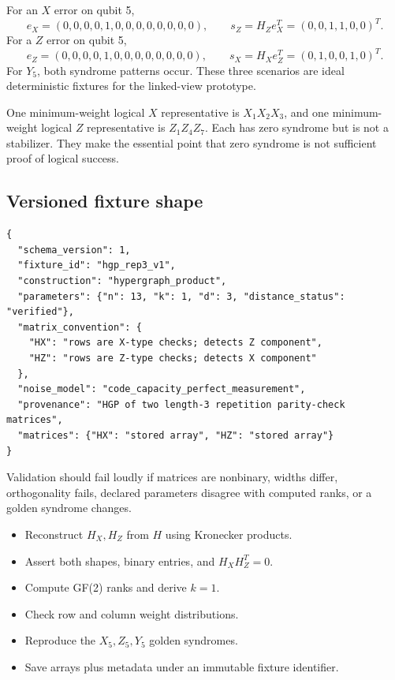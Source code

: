 \documentclass[11pt]{article}
\begin{document}
For an \(X\) error on qubit 5,
\[
e_X=(0,0,0,0,1,0,0,0,0,0,0,0,0),
\qquad
s_Z=H_Ze_X^T=(0,0,1,1,0,0)^T.
\]
For a \(Z\) error on qubit 5,
\[
e_Z=(0,0,0,0,1,0,0,0,0,0,0,0,0),
\qquad
s_X=H_Xe_Z^T=(0,1,0,0,1,0)^T.
\]
For \(Y_5\), both syndrome patterns occur. These three scenarios are ideal deterministic fixtures for
the linked-view prototype.

One minimum-weight logical \(X\) representative is \(X_1X_2X_3\), and one minimum-weight logical
\(Z\) representative is \(Z_1Z_4Z_7\). Each has zero syndrome but is not a stabilizer. They make the
essential point that zero syndrome is not sufficient proof of logical success.

\subsection{Versioned fixture shape}

\begin{lstlisting}[style=json]
{
  "schema_version": 1,
  "fixture_id": "hgp_rep3_v1",
  "construction": "hypergraph_product",
  "parameters": {"n": 13, "k": 1, "d": 3, "distance_status": "verified"},
  "matrix_convention": {
    "HX": "rows are X-type checks; detects Z component",
    "HZ": "rows are Z-type checks; detects X component"
  },
  "noise_model": "code_capacity_perfect_measurement",
  "provenance": "HGP of two length-3 repetition parity-check matrices",
  "matrices": {"HX": "stored array", "HZ": "stored array"}
}
\end{lstlisting}

Validation should fail loudly if matrices are nonbinary, widths differ, orthogonality fails, declared
parameters disagree with computed ranks, or a golden syndrome changes.

\begin{masterybox}[title={Day 8 validation checklist}]
\begin{itemize}[label=\(\square\)]
  \item Reconstruct \(H_X,H_Z\) from \(H\) using Kronecker products.
  \item Assert both shapes, binary entries, and \(H_XH_Z^T=0\).
  \item Compute GF(2) ranks and derive \(k=1\).
  \item Check row and column weight distributions.
  \item Reproduce the \(X_5,Z_5,Y_5\) golden syndromes.
  \item Save arrays plus metadata under an immutable fixture identifier.
\end{itemize}
\end{masterybox}
\end{document}
